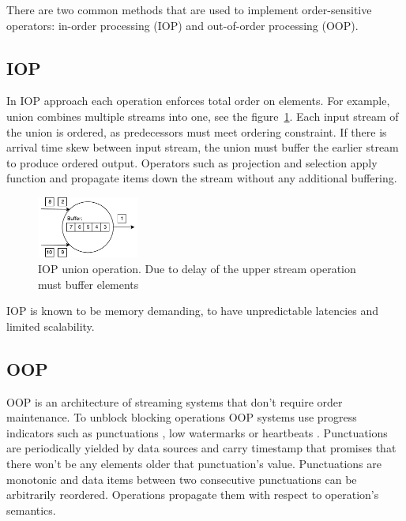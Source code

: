 
\label {fs-typical}

There are two common methods that are used to implement order-sensitive operators: in-order processing (IOP) \cite{Arasu:2006:CCQ:1146461.1146463} \cite{Cranor:2003:GSD:872757.872838} \cite{hammad2004optimizing} and out-of-order processing (OOP)\cite{Li:2008:OPN:1453856.1453890}.

\subsection{IOP}

In IOP approach each operation enforces total order on elements. For example, union combines multiple streams into one, see the figure~\ref{iop}. Each input stream of the union is ordered, as predecessors must meet ordering constraint. If there is arrival time skew between input stream, the union must buffer the earlier stream to produce ordered output. Operators such as projection and selection apply function and propagate items down the stream without any additional buffering.

\begin{figure}[htbp]
  \centering
  \includegraphics[width=0.30\textwidth]{pics/iop}
  \caption{IOP union operation. Due to delay of the upper stream operation must buffer elements}
  \label {iop}
\end{figure}

IOP is known to be memory demanding, to have unpredictable latencies and limited scalability.\cite{Li:2008:OPN:1453856.1453890}

\subsection{OOP}

OOP is an architecture of streaming systems that don't require order maintenance. To unblock blocking operations OOP systems use progress indicators such as punctuations \cite{Tucker:2003:EPS:776752.776780}, low watermarks \cite{Akidau:2013:MFS:2536222.2536229} or heartbeats \cite{Srivastava:2004:FTM:1055558.1055596}. Punctuations are periodically yielded by data sources and carry timestamp that promises that there won't be any elements older that punctuation's value. Punctuations are monotonic and data items between two consecutive punctuations can be arbitrarily reordered. Operations propagate them with respect to operation's semantics.

